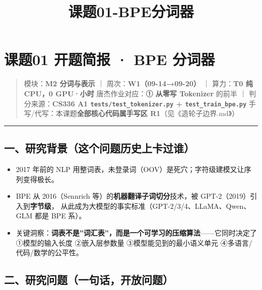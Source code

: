 \documentclass[
  chinese,
  11pt,
]{ctexart}
\title{课题01-BPE分词器}
\author{}
\date{}
\providecommand{\tightlist}{%
  \setlength{\itemsep}{0pt}\setlength{\parskip}{0pt}}
\begin{document}
\maketitle

{
\setcounter{tocdepth}{2}
\tableofcontents
}
\section{课题01 开题简报 · BPE 分词器}\label{ux8bfeux989801-ux5f00ux9898ux7b80ux62a5-bpe-ux5206ux8bcdux5668}

\begin{quote}
模块：\textbf{M2 分词与表示} ｜ 周次：\textbf{W1（09-14→09-20）} ｜ 算力：\textbf{T0 纯 CPU，0 GPU·小时} 唐杰作业对应：\textbf{① 从零写 Tokenizer} 的前半 ｜ 判分来源：\textbf{CS336 A1 \texttt{tests/test\_tokenizer.py} + \texttt{test\_train\_bpe.py}} 手写/代写：本课题\textbf{全部核心代码属手写区 R1}（见《造轮子边界.md》）
\end{quote}

\begin{center}\rule{0.5\linewidth}{0.5pt}\end{center}

\subsection{一、研究背景（这个问题历史上卡过谁）}\label{ux4e00ux7814ux7a76ux80ccux666fux8fd9ux4e2aux95eeux9898ux5386ux53f2ux4e0aux5361ux8fc7ux8c01}

\begin{itemize}
\tightlist
\item
  2017 年前的 NLP 用整词表，未登录词（OOV）是死穴；字符级建模又让序列变得极长。
\item
  BPE 从 2016（Sennrich 等）的\textbf{机器翻译子词切分}技术，被 GPT-2（2019）引入到\textbf{字节级}， 从此成为大模型的事实标准（GPT-2/3/4、LLaMA、Qwen、GLM 都是 BPE 系）。
\item
  关键洞察：\textbf{词表不是''词汇表''，而是一个可学习的压缩算法}------它同时决定了 ①模型的输入长度 ②嵌入层参数量 ③模型能见到的最小语义单元 ④多语言/代码/数学的公平性。
\end{itemize}

\subsection{二、研究问题（一句话，开放问题）}\label{ux4e8cux7814ux7a76ux95eeux9898ux4e00ux53e5ux8bddux5f00ux653eux95eeux9898}
\end{document}
